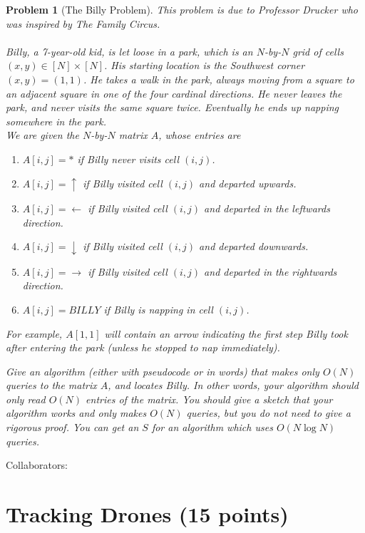 \documentclass[10pt]{article}
\newcommand{\solution}[1]{
\vspace{2mm}

\noindent Collaborators:

\vspace{5mm}

\medskip\noindent{\color{cit}\textbf{Solution:} #1}}
\newtheorem{problem}{\sc\color{cit}Problem}
\begin{document}
\iffalse
\begin{problem}[The Billy Problem]
This problem is due to Professor Drucker who was inspired by The Family Circus.\\  
\\
Billy, a 7-year-old kid, is let loose in a park, which is an $N$-by-$N$ grid of cells $(x, y) \in [N]\times [N]$. His starting location is the Southwest corner $(x, y) = (1, 1)$. He takes a walk in the park, always moving from a square to an adjacent square in one of the four cardinal directions.  He never leaves the park, and never visits the same square twice.  Eventually he ends up napping somewhere in the park. \\

We are given the $N$-by-$N$ matrix $A$, whose entries are 
\begin{enumerate}
\item $A[i, j] = *$ if Billy never visits cell $(i, j)$.
\item $A[i, j] = \uparrow$ if Billy visited cell $(i, j)$ and departed upwards.
\item $A[i, j] = \leftarrow$ if Billy visited cell $(i, j)$ and departed in the leftwards direction.
\item $A[i, j] = \downarrow$ if Billy visited cell $(i, j)$ and departed downwards.
\item $A[i, j] = \rightarrow$ if Billy visited cell $(i, j)$ and departed in the rightwards direction.
\item $A[i, j] = BILLY$ if Billy is napping in cell $(i, j)$.
\end{enumerate}

For example, $A[1, 1]$ will contain an arrow indicating the first step Billy took after entering the park (unless he stopped to nap immediately).

Give an algorithm (either with pseudocode or in words) that makes only $O(N)$ queries to the matrix $A$, and locates Billy. In other words, your algorithm should only read $O(N)$ entries of the matrix. You should give a sketch that your algorithm works and only makes $O(N)$ queries, but you do not need to give a rigorous proof. You can get an $S$ for an algorithm which uses $O(N \log N)$ queries.

\end{problem}

\solution{
Your solution here.
}
\section{Tracking Drones (15 points)}
\end{document}
